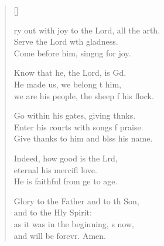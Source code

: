 \settowidth{\versewidth}{Cry out with joy to the Lord, all the earth. +}
\begin{verse}[\versewidth]
  \begin{patverse}
ry out with joy to the Lord, all the arth.\Flex\\
Serve the Lord w\pointup{\i}th gladness.\Med\\
Come before him, sing\pointup{\i}ng for joy.

Know that he, the Lord, is Gd.\Flex\\
He made us, we belong t him,\Med\\
we are his people, the sheep f his flock.

Go within his gates, giving thnks.\Flex\\
Enter his courts with songs f praise.\Med\\
Give thanks to him and blss his name.

Indeed, how good is the Lrd,\Flex\\
eternal his mercifl love.\Med\\
He is faithful from ge to age.

Glory to the Father and to th Son,\Med\\
and to the Hly Spirit:\\
as it was in the beginning, \pointup{\i}s now,\Med\\
and will be forevr. Amen.
  \end{patverse}
\end{verse}
